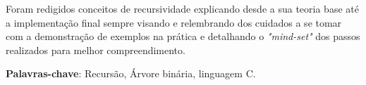 \documentclass[
	12pt,				%
	oneside,   	        %
	a4paper,			%
	chapter=TITLE,		%
	section=TITLE,		%
	subsection=TITLE,	%
	subsubsection=TITLE,%
	english,			%
	french,				%
	spanish,			%
	brazil,				%
	]{pacotes/abntex2}
\begin{document}
\frenchspacing 



\imprimirfolhaderosto



\begin{resumo}
 
 Foram redigidos conceitos de recursividade explicando desde a sua teoria base até a implementação final sempre visando e relembrando dos cuidados a se tomar com a demonstração de exemplos na prática e detalhando o \textit{"mind-set"} dos passos realizados para melhor compreendimento.

 \vspace{\onelineskip}
    
 \noindent
 \textbf{Palavras-chave}: Recursão, Árvore binária, linguagem C.
\end{resumo}




\tableofcontents*
\cleardoublepage


\end{document}
